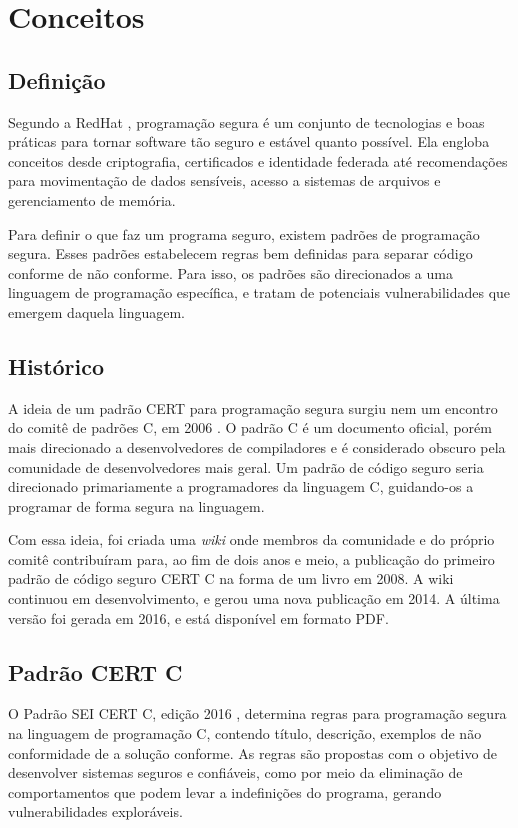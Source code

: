 \chapter{Conceitos}
\label{cap1}
\section{Definição}

Segundo a RedHat \cite{redhat}, programação segura é um conjunto de tecnologias e boas práticas para tornar software tão seguro e estável quanto possível. Ela engloba conceitos desde criptografia, certificados e identidade federada até recomendações para movimentação de dados sensíveis, acesso a sistemas de arquivos e gerenciamento de memória.

Para definir o que faz um programa seguro, existem padrões de programação segura. Esses padrões estabelecem regras bem definidas para separar código conforme de não conforme. Para isso, os padrões são direcionados a uma linguagem de programação específica, e tratam de potenciais vulnerabilidades que emergem daquela linguagem.

\section{Histórico}

A ideia de um padrão CERT para programação segura surgiu nem um encontro do comitê de padrões C, em 2006 \cite{certhistory}. O padrão C é um documento oficial, porém mais direcionado a desenvolvedores de compiladores e é considerado obscuro pela comunidade de desenvolvedores mais geral. Um padrão de código seguro seria direcionado primariamente a programadores da linguagem C, guidando-os a programar de forma segura na linguagem.

Com essa ideia, foi criada uma \textit{wiki} onde membros da comunidade e do próprio comitê contribuíram para, ao fim de dois anos e meio, a publicação do primeiro padrão de código seguro CERT C na forma de um livro em 2008. A wiki continuou em desenvolvimento, e gerou uma nova publicação em 2014. A última versão foi gerada em 2016, e está disponível em formato PDF.

\section{Padrão CERT C}

O Padrão SEI CERT C, edição 2016 \cite{ccert}, determina regras para programação segura na linguagem de programação C, contendo título, descrição, exemplos de não conformidade de a solução conforme. As regras são propostas com o objetivo de desenvolver sistemas seguros e confiáveis, como por meio da eliminação de comportamentos que podem levar a indefinições do programa, gerando vulnerabilidades exploráveis.

